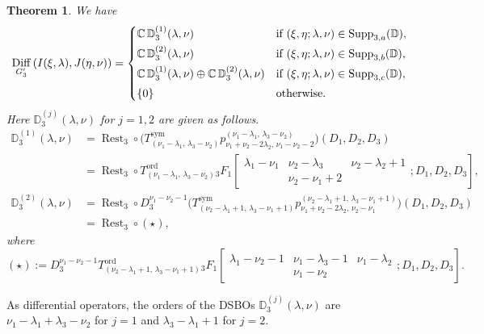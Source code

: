 \documentclass[a4paper,11pt,reqno]{amsart}
\newcommand{\CC}{\mathbb{C}}
\newcommand{\DD}{\mathbb{D}}
\newcommand{\0}{{\bf 0}}
\newcommand{\1}{{\bf 1}}
\newcommand{\ord}{{\mathrm{ord}}}
\DeclareMathOperator{\Supp}{Supp}
\DeclareMathOperator{\Diff}{Diff}
\DeclareMathOperator{\Rest}{Rest}
\theoremstyle{plain}
\newtheorem{theorem}[equation]{Theorem}
\theoremstyle{definition}
\numberwithin{equation}{section}
\theoremstyle{definition}
\begin{document}
\begin{theorem}\label{thm:cons3}
We have
\begin{equation*}
\Diff_{G_3^\prime}\left(I(\xi, \lambda), J(\eta, \nu)\right)
=
\begin{cases}
\CC\, \DD^{(1)}_3(\lambda, \nu) & 
\textnormal{if $(\xi, \eta; \lambda, \nu) \in \Supp_{3,a}(\DD)$},\\[3pt]
\CC\, \DD^{(2)}_3(\lambda, \nu) & 
\textnormal{if $(\xi, \eta; \lambda, \nu) \in \Supp_{3,b}(\DD)$},\\[3pt]
\CC\, \DD^{(1)}_3(\lambda, \nu) 
\oplus
\CC\, \DD^{(2)}_3(\lambda, \nu)
& \textnormal{if $(\xi, \eta; \lambda, \nu) \in \Supp_{3,c}(\DD)$},\\[3pt]
\{0\} &\textnormal{otherwise}.
\end{cases}
\end{equation*}
Here $\DD^{(j)}_3(\lambda, \nu)$ for $j=1,2$ 
are given as follows.
\vspace{5pt}
\begin{align*}
\DD^{(1)}_3(\lambda,\nu)
&=\Rest_3\circ
\big(T^{\mathrm{sym}}_{(\nu_1-\lambda_1, \,\lambda_3-\nu_2)} 
p^{(\nu_1-\lambda_1, \,\lambda_3-\nu_2)}_{\nu_1+\nu_2-2\lambda_2, \,\nu_1-\nu_2-2}\big)
(D_1, D_2, D_3)\\[5pt]
&=\Rest_3\circ 
T^\ord_{(\nu_1-\lambda_1,\,\lambda_3-\nu_2)}{}_3F_1
\left [\begin{matrix}
    \lambda_1-\nu_1 &\nu_2-\lambda_3 & \nu_2-\lambda_2+1\\
    & \nu_2-\nu_1+2 & 
\end{matrix}; D_1, D_2, D_3 \right],\\[10pt]
\DD^{(2)}_3(\lambda,\nu)
&=\Rest_3\circ  D_3^{\nu_1-\nu_2-1}\big(T^{\mathrm{sym}}_{(\nu_2-\lambda_1+1,\,\lambda_3-\nu_1+1)} p^{(\nu_2-\lambda_1+1, \,\lambda_3-\nu_1+1)}_{\nu_1+\nu_2-2\lambda_2, \,\nu_2-\nu_1}\big)(D_1, D_2, D_3) \\[5pt]
&=\Rest_3\circ (\star),
\end{align*}
where
\begin{equation*}
(\star):=
 D_3^{\nu_1-\nu_2-1}
T^\ord_{(\nu_2-\lambda_1+1,\,\lambda_3-\nu_1+1)}{}_3F_1\left [\begin{matrix}
    \lambda_1-\nu_2-1 & \nu_1-\lambda_3-1 & \nu_1-\lambda_2\\
    & \nu_1-\nu_2& 
\end{matrix}; D_1, D_2, D_3\right].
\end{equation*}
\end{theorem}

As differential operators,
the orders 
of the DSBOs $\DD^{(j)}_3(\lambda,\nu)$ are
$\nu_1-\lambda_1+\lambda_3 - \nu_2$ for $j=1$
and 
$\lambda_3-\lambda_1+1$ for $j=2$.
\end{document}
